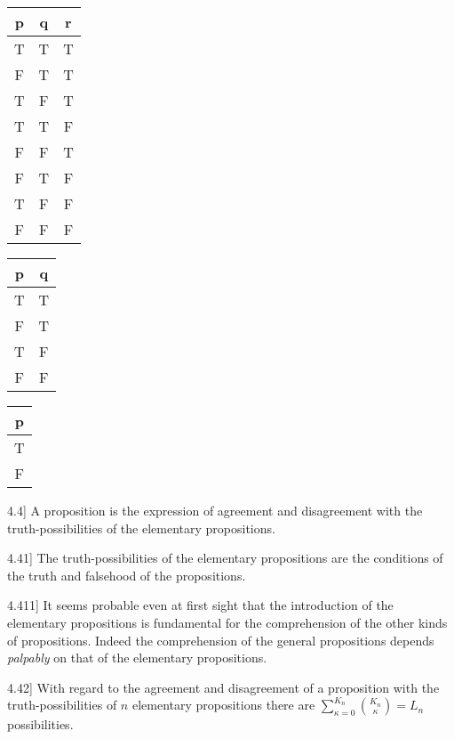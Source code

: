 \documentclass[12pt,oneside]{book}[2007/10/19]
\newcommand{\PropositionE}[2]{%
  \item[\phantomsection\label{PropE:#1}\PropGRef{#1}] #2%
}
\newcommand{\PropGRef}[1]{\hyperref[PropG:#1]{#1}}
\newcommand{\Strut}[1][12pt]{\rule{0pt}{#1}}
\begin{document}
\begin{propositions}
{\begin{center}
\begin{tabular}[t]{c|c|c}
p & q & r\\
\hline
\hline
\Strut T & T & T\\
\hline
\Strut F & T & T\\
\hline
\Strut T & F & T\\
\hline
\Strut T & T & F\\
\hline
\Strut F & F & T\\
\hline
\Strut F & T & F\\
\hline
\Strut T & F & F\\
\hline
\Strut F & F & F\\
\hline
\end{tabular}
\hspace{0.5cm}
\begin{tabular}[t]{c|c}
p & q\\
\hline
\hline
\Strut T & T\\
\hline
\Strut F & T\\
\hline
\Strut T & F\\
\hline
\Strut F & F\\
\hline
\end{tabular}
\hspace{0.5cm}
\begin{tabular}[t]{c}
p\\
\hline
\hline
\Strut T\\
\hline
\Strut F\\
\hline
\end{tabular}
\end{center}
}


\PropositionE{4.4}
{A proposition is the expression of agreement
and disagreement with the truth-pos\-si\-bil\-i\-ties of
the elementary propositions.}


\PropositionE{4.41}
{The truth-possibilities of the elementary propositions
are the conditions of the truth and
falsehood of the propositions.}


\PropositionE{4.411}
{It seems probable even at first sight that the
introduction of the elementary propositions is
fundamental for the comprehension of the other
kinds of propositions. Indeed the comprehension
of the general propositions depends \emph{palpably} on
that of the elementary propositions.}


\PropositionE{4.42}
{With regard to the agreement and disagreement
of a proposition with the truth-possibilities
of $n$ elementary propositions there
are $\sum\limits_{\kappa = 0}^{K_n}\binom{K_n}{\kappa} = L_{n}$ possibilities.}



\end{propositions}
\end{document}
